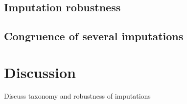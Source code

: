 \subsection{Imputation robustness}

\subsection{Congruence of several imputations}


\section{Discussion}
Discuss taxonomy and robustness of imputations

